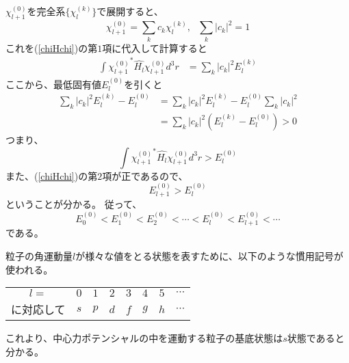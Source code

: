 $\chi_{l+1}^{(0)}$を完全系$\{\chi_l^{(k)}\}$で展開すると、
\begin{equation}
	\chi_{l+1}^{(0)} = \sum_k c_k \chi_l^{(k)},~~~\sum_k |c_k|^2 = 1
\end{equation}
これを(\ref{chiHchi})の第$1$項に代入して計算すると
\begin{align}
	\int {\chi_{l+1}^{(0)}}^* \hat{H_l} \chi_{l+1}^{(0)} d^3r
	&= \sum_k |c_k|^2 E_l^{(k)}
\end{align}
ここから、最低固有値$E_l^{(0)}$を引くと
\begin{align}
	\sum_k |c_k|^2 E_l^{(k)} - E_l^{(0)}
	&= \sum_k |c_k|^2 E_l^{(k)} - E_l^{(0)}\sum_k|c_k|^2 \\
	&= \sum_k |c_k|^2(E_l^{(k)} - E_l^{(0)}) > 0
\end{align}
つまり、
\begin{equation}
	\int {\chi_{l+1}^{(0)}}^* \hat{H_l} \chi_{l+1}^{(0)} d^3r > E_l^{(0)}
\end{equation}
また、(\ref{chiHchi})の第$2$項が正であるので、
\begin{equation}
	E_{l+1}^{(0)} > E_{l}^{(0)}
\end{equation}
ということが分かる。
従って、
\begin{equation}
	E_{0}^{(0)} < E_{1}^{(0)} < E_{2}^{(0)} < \cdots < E_{l}^{(0)} < E_{l+1}^{(0)} < \cdots
\end{equation}
である。

粒子の角運動量$l$が様々な値をとる状態を表すために、以下のような慣用記号が使われる。
\begin{table}[htb]
	\begin{center}
	\begin{tabular}{cccccccc}
		$l=$     & $0$ & $1$ & $2$ & $3$ & $4$ & $5$ & $\cdots$ \\
		に対応して & $s$ & $p$ & $d$ & $f$ & $g$ & $h$ & $\cdots$
	\end{tabular}
	\end{center}
\end{table}

これより、中心力ポテンシャルの中を運動する粒子の基底状態は$s$状態であると分かる。
